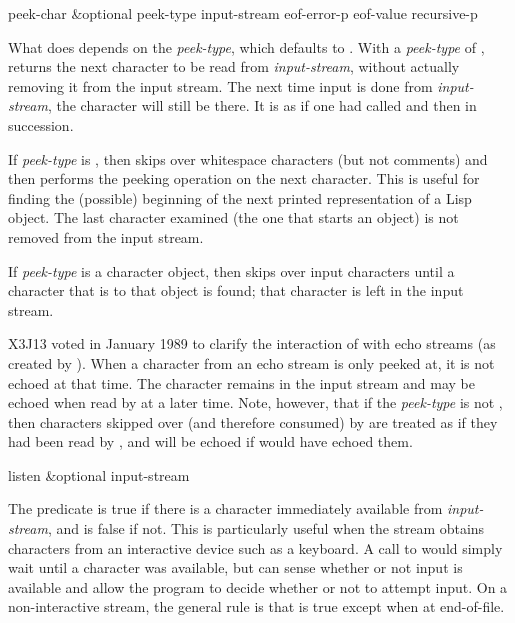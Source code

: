 \newpage%

\begin{defun}[Function]
peek-char &optional peek-type input-stream eof-error-p eof-value recursive-p

What  does depends on the \emph{peek-type}, which
defaults to {\false}.  With a \emph{peek-type} of {\false},
 returns the next character to be read from 
\emph{input-stream}, without actually removing it from the input stream.
The next time input is done from \emph{input-stream}, the character will still
be there.  It is as if one had called  and then 
in succession.

If \emph{peek-type} is {\true}, then  skips over whitespace
characters (but not comments)
and then performs the peeking operation on the next
character.
This is useful for finding the (possible) beginning
of the next printed representation of a Lisp object.
The last character examined (the one that starts an object)
is not removed from the input stream.

If \emph{peek-type} is a character object, then  skips
over input characters until a character that
is  to that object is found;
that character is left in the input stream.

\begin{new}
X3J13 voted in January 1989
to clarify the interaction of  with echo streams
(as created by ).  When a character from an echo
stream is only peeked at, it is not echoed at that time.  The character remains in
the input stream and may be echoed when read by  at a later time.
Note, however, that if the \emph{peek-type} is not , then characters
skipped over (and therefore consumed) by  are treated as if they had been read
by , and will be echoed if  would have echoed them.
\end{new}
\end{defun}

\begin{defun}[Function]
listen &optional input-stream

The predicate  is true if there is a character
immediately available from \emph{input-stream}, and is false if not.
This is particularly useful when the stream obtains characters
from an interactive device such as a keyboard.  A call to 
would simply wait until a character was available, but  can
sense whether or not input is available and allow the program to
decide whether or not to attempt input.  On a non-interactive stream,
the general rule is that  is true except when at
end-of-file.
\end{defun}

